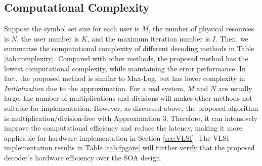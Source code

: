 \documentclass[journal,twoside]{IEEEtran}
\begin{document}
\subsection{Computational Complexity}
Suppose the symbol set size for each user is $M$, the number of physical resources is $N$, the user number is $K$, and the maximum iteration number is $I$. Then, we summarize the computational complexity of different decoding methods in Table \ref{tab:complexity}. Compared with other methods, the proposed method has the lowest computational complexity, while maintaining the error performance. In fact, the proposed method is similar to Max-Log, but has lower complexity in \emph{Initialization} due to the approximation. For a real system, $M$ and $N$ are usually large, the number of multiplications and divisions will makes other methods not suitable for implementation. However, as discussed above, the proposed algorithm is multiplication/division-free with Approximation $3$. Therefore, it can intensively improve the computational efficiency and reduce the latency, making it more applicable for hardware implementation in Section \ref{sec:VLSI}. The VLSI implementation results in Table \ref{tab:fpgare} will further verify that the proposed decoder's hardware efficiency over the SOA design.
\end{document}
